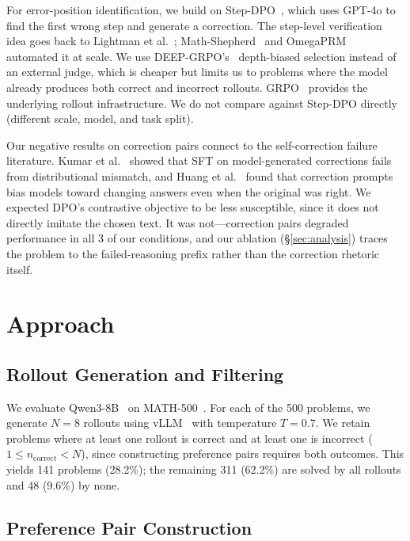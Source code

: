 \documentclass{article}
\begin{document}
For error-position identification, we build on Step-DPO~\cite{lai2024stepdpo}, which uses GPT-4o to find the first wrong step and generate a correction.
The step-level verification idea goes back to Lightman et al.~\cite{lightman2023verify}; Math-Shepherd~\cite{mathshepherd2024} and OmegaPRM~\cite{omegaprm2024} automated it at scale.
We use DEEP-GRPO's~\cite{deepgrpo2026} depth-biased selection instead of an external judge, which is cheaper but limits us to problems where the model already produces both correct and incorrect rollouts.
GRPO~\cite{shao2024grpo} provides the underlying rollout infrastructure.
We do not compare against Step-DPO directly (different scale, model, and task split).

Our negative results on correction pairs connect to the self-correction failure literature.
Kumar et al.~\cite{kumar2024score} showed that SFT on model-generated corrections fails from distributional mismatch, and Huang et al.~\cite{huang2024selfcorrect} found that correction prompts bias models toward changing answers even when the original was right.
We expected DPO's contrastive objective to be less susceptible, since it does not directly imitate the chosen text.
It was not---correction pairs degraded performance in all 3 of our conditions, and our ablation (\S\ref{sec:analysis}) traces the problem to the failed-reasoning prefix rather than the correction rhetoric itself.

\section{Approach}
\label{sec:approach}

\subsection{Rollout Generation and Filtering}

We evaluate Qwen3-8B~\cite{qwen3_2025} on MATH-500~\cite{hendrycks2021math}.
For each of the 500 problems, we generate $N = 8$ rollouts using vLLM~\cite{kwon2023vllm} with temperature $T = 0.7$.
We retain problems where at least one rollout is correct and at least one is incorrect ($1 \leq n_{\text{correct}} < N$), since constructing preference pairs requires both outcomes.
This yields 141 problems (28.2\%); the remaining 311 (62.2\%) are solved by all rollouts and 48 (9.6\%) by none.

\subsection{Preference Pair Construction}
\end{document}
